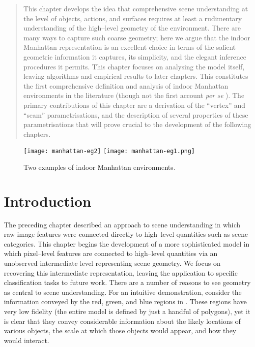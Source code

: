\begin{quote}
  This chapter develops the idea that comprehensive scene
  understanding at the level of objects, actions, and surfaces
  requires at least a rudimentary understanding of the high--level
  geometry of the environment. There are many ways to capture such
  coarse geometry; here we argue that the indoor Manhattan
  representation is an excellent choice in terms of the salient
  geometric information it captures, its simplicity, and the elegant
  inference procedures it permits. This chapter focuses on analysing
  the model itself, leaving algorithms and empirical results to later
  chapters. This constitutes the first comprehensive definition and
  analysis of indoor Manhattan environments in the literature (though
  not the first account \textit{per se} \cite{Lee09}). The primary
  contributions of this chapter are a derivation of the ``vertex'' and
  ``seam'' parametrisations, and the description of several properties
  of these parametrisations that will prove crucial to the development
  of the following chapters.\footnotemark
\end{quote}


\begin{figure}[tb]%
  \centering
    \texttt{[image: manhattan-eg2]}
    \texttt{[image: manhattan-eg1.png]}
    \caption{Two examples of indoor Manhattan environments.}
  \label{fig:geometry-egs}
\end{figure}

\section{Introduction}

The preceding chapter described an approach to scene understanding in
which raw image features were connected directly to high--level
quantities such as scene categories. This chapter begins the
development of a more sophisticated model in which pixel--level
features are connected to high--level quantities via an unobserved
intermediate level representing scene geometry. We focus on recovering
this intermediate representation, leaving the application to specific
classification tasks to future work. There are a number of reasons to
see geometry as central to scene understanding. For an intuitive
demonstration, consider the information conveyed by the red, green,
and blue regions in . These regions have very low
fidelity (the entire model is defined by just a handful of polygons),
yet it is clear that they convey considerable information about the
likely locations of various objects, the scale at which those objects
would appear, and how they would interact.

